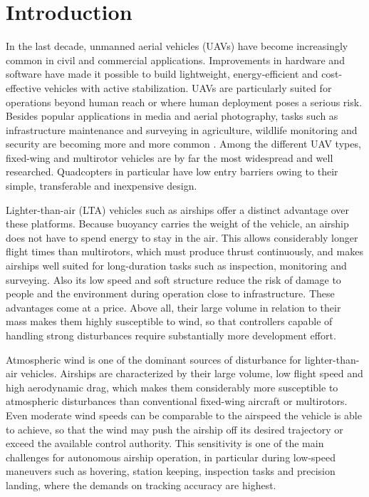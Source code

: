 


\chapter{Introduction}
\label{chap:1.Introduction}

In the last decade, unmanned aerial vehicles (UAVs) have become increasingly common in civil and commercial applications. Improvements in hardware and software have made it possible to build lightweight, energy-efficient and cost-effective vehicles with active stabilization. UAVs are particularly suited for operations beyond human reach or where human deployment poses a serious risk. Besides popular applications in media and aerial photography, tasks such as infrastructure maintenance and surveying in agriculture, wildlife monitoring and security are becoming more and more common \cite{MazurEtAl16, dro18}. Among the different UAV types, fixed-wing and multirotor vehicles are by far the most widespread and well researched. Quadcopters in particular have low entry barriers owing to their simple, transferable and inexpensive design.

Lighter-than-air (LTA) vehicles such as airships offer a distinct advantage over these platforms. Because buoyancy carries the weight of the vehicle, an airship does not have to spend energy to stay in the air. This allows considerably longer flight times than multirotors, which must produce thrust continuously, and makes airships well suited for long-duration tasks such as inspection, monitoring and surveying. Also its low speed and soft structure reduce the risk of damage to people and the environment during operation close to infrastructure. These advantages come at a price. Above all, their large volume in relation to their mass makes them highly susceptible to wind, so that controllers capable of handling strong disturbances require substantially more development effort.

Atmospheric wind is one of the dominant sources of disturbance for lighter-than-air vehicles. Airships are characterized by their large volume, low flight speed and high aerodynamic drag, which makes them considerably more susceptible to atmospheric disturbances than conventional fixed-wing aircraft or multirotors. Even moderate wind speeds can be comparable to the airspeed the vehicle is able to achieve, so that the wind may push the airship off its desired trajectory or exceed the available control authority. This sensitivity is one of the main challenges for autonomous airship operation, in particular during low-speed maneuvers such as hovering, station keeping, inspection tasks and precision landing, where the demands on tracking accuracy are highest.

